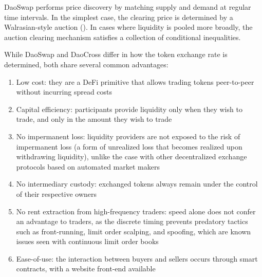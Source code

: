 \documentclass[11pt, reqno]{amsart}
\theoremstyle{definition}
\theoremstyle{remark}
\begin{document}
DaoSwap performs price discovery by matching supply and demand at regular time
intervals. In the simplest case, the clearing price is determined by a
Walrasian-style auction (\cite{Wa}). In cases where liquidity is pooled more
broadly, the auction clearing mechanism satisfies a collection of conditional
inequalities.

While DaoSwap and DaoCross differ in how the token exchange rate is determined,
both share several common advantages:
\begin{enumerate}
	\item Low cost:
	      they are a DeFi primitive that allows trading tokens peer-to-peer
	      without incurring spread costs
	\item Capital efficiency:
	      participants provide liquidity only when
	      they wish to trade, and only in the amount they wish to trade
	\item No impermanent loss:
	      liquidity providers are not exposed to the risk of impermanent loss
	      (a form of unrealized loss that becomes realized upon withdrawing
	      liquidity), unlike the case with other decentralized exchange protocols
	      based on automated market makers
	\item No intermediary custody:
	      exchanged tokens always remain under the control of their respective
	      owners
	\item No rent extraction from high-frequency traders:
	      speed alone does not confer an advantage to traders, as the discrete
	      timing prevents predatory tactics such as front-running, limit order
	      scalping, and spoofing, which are known issues seen with continuous
	      limit order books
	\item Ease-of-use: the interaction between buyers and sellers occurs
	      through smart contracts, with a website front-end available
\end{enumerate}


\end{document}
